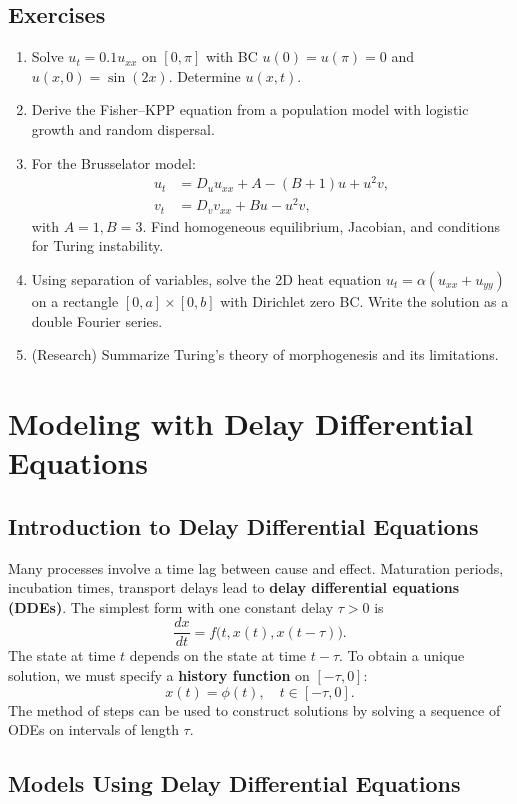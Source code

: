 \documentclass[12pt,a4paper]{book}
\begin{document}
\section{Exercises}
\begin{enumerate}[leftmargin=*, label=\textbf{Exercise 4.\arabic*}]
    \item Solve $u_t = 0.1 u_{xx}$ on $[0,\pi]$ with BC $u(0)=u(\pi)=0$ and $u(x,0)=\sin(2x)$. Determine $u(x,t)$.
    \item Derive the Fisher–KPP equation from a population model with logistic growth and random dispersal.
    \item For the Brusselator model:
    \begin{align*}
    u_t &= D_u u_{xx} + A - (B+1)u + u^2 v,\\
    v_t &= D_v v_{xx} + B u - u^2 v,
    \end{align*}
    with $A=1, B=3$. Find homogeneous equilibrium, Jacobian, and conditions for Turing instability.
    \item Using separation of variables, solve the 2D heat equation $u_t = \alpha (u_{xx}+u_{yy})$ on a rectangle $[0,a]\times[0,b]$ with Dirichlet zero BC. Write the solution as a double Fourier series.
    \item (Research) Summarize Turing’s theory of morphogenesis and its limitations.
\end{enumerate}

\chapter{Modeling with Delay Differential Equations}
\section{Introduction to Delay Differential Equations}
Many processes involve a time lag between cause and effect. Maturation periods, incubation times, transport delays lead to \textbf{delay differential equations (DDEs)}. The simplest form with one constant delay $\tau>0$ is
\[
\frac{dx}{dt} = f\bigl(t, x(t), x(t-\tau)\bigr).
\]
The state at time $t$ depends on the state at time $t-\tau$. To obtain a unique solution, we must specify a \textbf{history function} on $[-\tau, 0]$:
\[
x(t) = \phi(t), \quad t \in [-\tau, 0].
\]
The method of steps can be used to construct solutions by solving a sequence of ODEs on intervals of length $\tau$.

\section{Models Using Delay Differential Equations}
\end{document}
